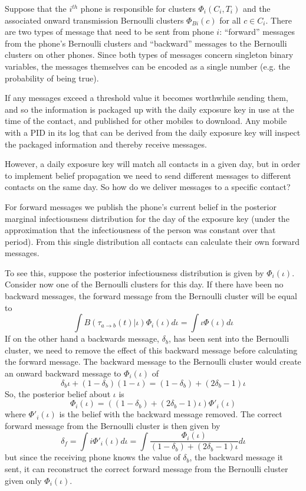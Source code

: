 \documentclass{article}
\begin{document}
Suppose that the $i^{th}$ phone is responsible for clusters $\Phi_i(C_i,T_i)$ and the associated onward transmission Bernoulli clusters $\Phi_{Bi}(c)$ for all $c\in C_i$. There are two types of message that need to be sent from phone $i$: ``forward'' messages from the phone's Bernoulli clusters and ``backward'' messages to the Bernoulli clusters on other phones. Since both types of messages concern singleton binary variables, the messages themselves can be encoded as a single number (e.g. the probability of being true).

If any messages exceed a threshold value it becomes worthwhile sending them, and so the information is packaged up with the daily exposure key in use at the time of the contact, and published for other mobiles to download. Any mobile with a PID in its log that can be derived from the daily exposure key will inspect the packaged information and thereby receive messages.

However, a daily exposure key will match all contacts in a given day, but in order to implement belief propagation we need to send different messages to different contacts on the same day. So how do we deliver messages to a specific contact?

For forward messages we publish the phone's current belief in the posterior marginal infectiousness distribution for the day of the exposure key (under the approximation that the infectiousness of the person was constant over that period). From this single distribution all contacts can calculate their own forward messages.

To see this, suppose the posterior infectiousness distribution is given by $\Phi_i(\iota)$. Consider now one of the Bernoulli clusters for this day. If there have been no backward messages, the forward message from the Bernoulli cluster will be equal to
\[
\int B(\tau_{a\rightarrow b}(t)|\iota)\Phi_i(\iota) d\iota = \int \iota\Phi(\iota) d\iota
\]
If on the other hand a backwards message, $\delta_b$, has been sent into the Bernoulli cluster, we need to remove the effect of this backward message before calculating the forward message. The backward message to the Bernoulli cluster would create an onward backward message to $\Phi_i(\iota)$ of
\[
\delta_b\iota + (1-\delta_b)(1-\iota) = (1 - \delta_b) + (2\delta_b - 1)\iota
\]
So, the posterior belief about $\iota$ is
\[
\Phi_i(\iota) = ((1 - \delta_b) + (2\delta_b - 1)\iota)\Phi'_i(\iota)
\]
where $\Phi'_i(\iota)$ is the belief with the backward message removed. The correct forward message from the Bernoulli cluster is then given by
\[
\delta_f = \int i \Phi'_i(\iota) d\iota = \int \frac{\Phi_i(\iota)}{(1 - \delta_b) + (2\delta_b - 1)\iota} d\iota
\]
but since the receiving phone knows the value of $\delta_b$, the backward message it sent, it can reconstruct the correct forward message from the Bernoulli cluster given only $\Phi_i(\iota)$.
\end{document}

